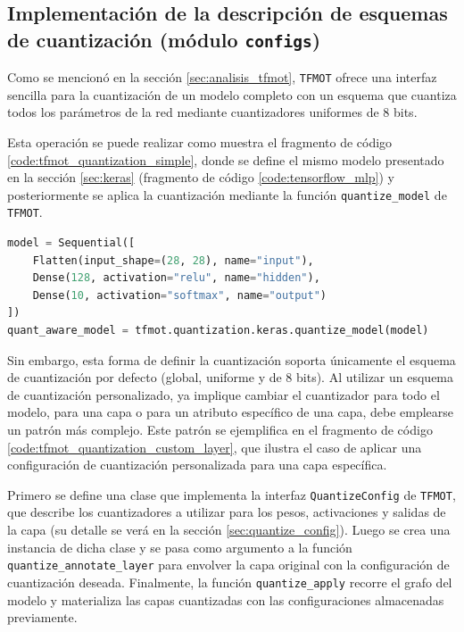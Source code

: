 \subsection{Implementación de la descripción de esquemas de cuantización (módulo \texttt{configs})}
\label{sec:implementation_configs}

Como se mencionó en la sección \ref{sec:analisis_tfmot}, \texttt{TFMOT} ofrece una interfaz sencilla para la cuantización de un modelo completo con un esquema que cuantiza todos los parámetros de la red mediante cuantizadores uniformes de 8 bits.

Esta operación se puede realizar como muestra el fragmento de código \ref{code:tfmot_quantization_simple}, donde se define el mismo modelo presentado en la sección \ref{sec:keras} (fragmento de código \ref{code:tensorflow_mlp}) y posteriormente se aplica la cuantización mediante la función \texttt{quantize\_model} de \texttt{TFMOT}.

\begin{lstlisting}[language=Python,label=code:tfmot_quantization_simple,caption=Uso de TFMOT para cuantización uniforme de 8 bits.]
model = Sequential([
    Flatten(input_shape=(28, 28), name="input"),
    Dense(128, activation="relu", name="hidden"),
    Dense(10, activation="softmax", name="output")
])
quant_aware_model = tfmot.quantization.keras.quantize_model(model)
\end{lstlisting}

Sin embargo, esta forma de definir la cuantización soporta únicamente el esquema de cuantización por defecto (global, uniforme y de 8 bits). Al utilizar un esquema de cuantización personalizado, ya implique cambiar el cuantizador para todo el modelo, para una capa o para un atributo específico de una capa, debe emplearse un patrón más complejo. Este patrón se ejemplifica en el fragmento de código \ref{code:tfmot_quantization_custom_layer}, que ilustra el caso de aplicar una configuración de cuantización personalizada para una capa específica.

Primero se define una clase que implementa la interfaz \texttt{QuantizeConfig} de \texttt{TFMOT}, que describe los cuantizadores a utilizar para los pesos, activaciones y salidas de la capa (su detalle se verá en la sección \ref{sec:quantize_config}). Luego se crea una instancia de dicha clase y se pasa como argumento a la función \texttt{quantize\_annotate\_layer} \cite{tfmot_quantize_py} para envolver la capa original con la configuración de cuantización deseada. Finalmente, la función \texttt{quantize\_apply} \cite{tfmot_quantize_py} recorre el grafo del modelo y materializa las capas cuantizadas con las configuraciones almacenadas previamente.

